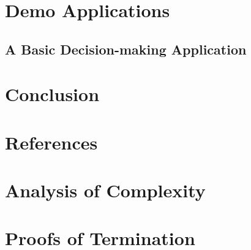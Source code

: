 \documentclass[a4paper]{report}
\begin{document}

\chapter{Demo Applications}

\section{A Basic Decision-making Application}




\chapter{Conclusion}
\label{chap:conclusion}








\chapter{References}






\appendix
{}




\chapter{Analysis of Complexity}


\chapter{Proofs of Termination}
\end{document}
